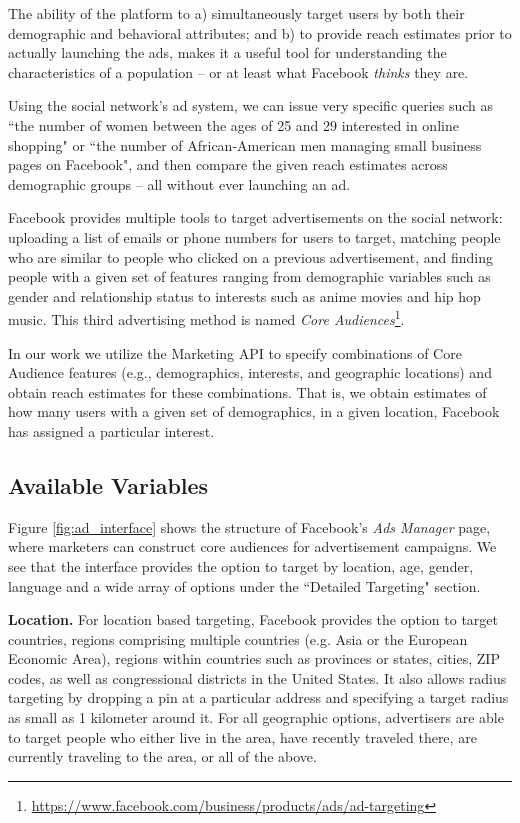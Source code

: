 The ability of the platform to a) simultaneously target users by both their demographic and behavioral attributes; and b) to provide reach estimates prior to actually launching the ads, makes it a useful tool for understanding the characteristics of a population -- or at least what Facebook \textit{thinks} they are.

Using the social network's ad system, we can issue very specific queries such as ``the number of women between the ages of 25 and 29 interested in online shopping" or ``the number of African-American men managing small business pages on Facebook", and then compare the given reach estimates across demographic groups -- all without ever launching an ad.

Facebook provides multiple tools to target advertisements on the social network: uploading a list of emails or phone numbers for users to target, matching people who are similar to people who clicked on a previous advertisement, and finding people with a given set of features ranging from demographic variables such as gender and relationship status to interests such as anime movies and hip hop music. This third advertising method is named \textit{Core Audiences}\footnote{\url{https://www.facebook.com/business/products/ads/ad-targeting}}.

In our work we utilize the Marketing API to specify combinations of Core Audience features (e.g., demographics, interests, and geographic locations) and obtain reach estimates for these combinations. That is, we obtain estimates of how many users with a given set of demographics, in a given location, Facebook has assigned a particular interest.

\subsection{Available Variables} \label{subsec:targeting_options}

Figure \ref{fig:ad_interface} shows the structure of Facebook's \textit{Ads Manager} page, where marketers can construct core audiences for advertisement campaigns. We see that the interface provides the option to target by location, age, gender, language and a wide array of options under the ``Detailed Targeting" section.

\textbf{Location.} For location based targeting, Facebook provides the option to target countries, regions comprising multiple countries (e.g. Asia or the European Economic Area), regions within countries such as provinces or states, cities, ZIP codes, as well as congressional districts in the United States. It also allows radius targeting by dropping a pin at a particular address and specifying a target radius as small as 1 kilometer around it. For all geographic options, advertisers are able to target people who either live in the area, have recently traveled there, are currently traveling to the area, or all of the above.

